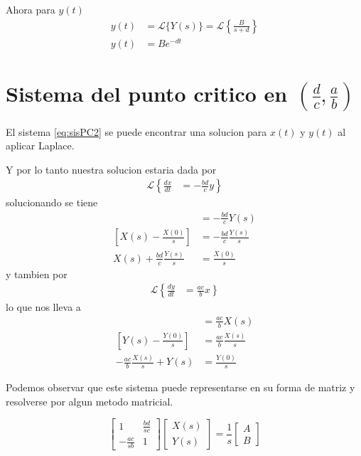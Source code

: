 \documentclass{report}
\begin{document}
Ahora para $y(t)$
\begin{align}
y(t)&=\mathcal{L}\{Y(s)\} =\mathcal{L}\left\{ \frac{B}{s+d}
\right\}\nonumber\\
y(t)&=Be^{-dt}
\end{align}

\section{Sistema del punto critico en $(\frac{d}{c},\frac{a}{b})$}
El sistema \ref{eq:sisPC2} se puede encontrar una solucion para $x(t)$ y $y(t)$ al aplicar Laplace.

Y por lo tanto nuestra solucion estaria dada por 
\begin{align*}
\mathcal{L}\left\{ \frac{dx}{dt}\right.
&=\left. -\frac{bd}{c}y  \right\}
\end{align*}
solucionando se tiene
\begin{align}
[sX(s)-X(0)]&=-\frac{bd}{c}Y(s) \nonumber \\
[X(s)-\frac{X(0)}{s}]&=-\frac{bd}{c}\frac{Y(s)}{s} \nonumber\\
X(s)+\frac{bd}{c}\frac{Y(s)}{s}&=\frac{X(0)}{s} \label{eq:lapXs}
\end{align}
y tambien por 
\begin{align*}
\mathcal{L}\left\{ \frac{dy}{dt}\right.
&= \left.\frac{ac}{b}x  \right\}
\end{align*}
lo que nos lleva a
\begin{align}
[sY(s)-Y(0)]&=\frac{ac}{b}X(s) \nonumber \\
[Y(s)-\frac{Y(0)}{s}]&=\frac{ac}{b}\frac{X(s)}{s} \nonumber \\
-\frac{ac}{b}\frac{X(s)}{s}+Y(s)&=\frac{Y(0)}{s} \label{eq:lapYs}
\end{align}

Podemos observar que este sistema puede representarse en su forma de matriz y resolverse por algun metodo matricial.

\begin{equation}
\left[\begin{matrix}
1 &\frac{bd}{sc} \\
-\frac{ac}{sb} &1
\end{matrix}\right]
\left[\begin{array}{c}
X(s)\\
Y(s)
\end{array}\right]
=
\frac{1}{s}\left[\begin{array}{c}
A\\
B
\end{array}\right]\label{eq:sistemAnLaplace}
\end{equation}
\end{document}
